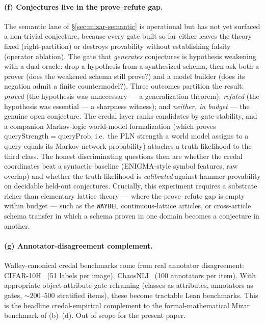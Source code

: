 \documentclass[]{article}
\newcommand{\lid}[1]{{\ttfamily\nolinkurl{#1}}}
\begin{document}
\paragraph{(f) Conjectures live in the prove--refute gap.} The semantic lane of
\S\ref{sec:mizar-semantic} is operational but has not yet surfaced a non-trivial
conjecture, because every gate built so far either leaves the theory fixed
(right-partition) or destroys provability without establishing falsity (operator
ablation). The gate that \emph{generates} conjectures is hypothesis weakening with a
dual oracle: drop a hypothesis from a synthesized schema, then ask both a prover
(does the weakened schema still prove?) and a model builder (does its negation admit
a finite countermodel?). Three outcomes partition the result: \emph{proved} (the
hypothesis was unnecessary --- a generalization theorem); \emph{refuted} (the
hypothesis was essential --- a sharpness witness); and \emph{neither, in budget} ---
the genuine open conjecture. The credal layer ranks candidates by gate-stability,
and a companion Markov-logic world-model formalization (which proves
$\mathrm{queryStrength} = \mathrm{queryProb}$, i.e.\ the PLN strength a world model
assigns to a query equals its Markov-network probability) attaches a
truth-likelihood to the third class. The honest discriminating questions then are
whether the credal coordinates beat a syntactic baseline (ENIGMA-style symbol
features, raw overlap) and whether the truth-likelihood is \emph{calibrated} against
hammer-provability on decidable held-out conjectures. Crucially, this experiment
requires a substrate richer than elementary lattice theory --- where the
prove--refute gap is empty within budget --- such as the \lid{WAYBEL}
continuous-lattice articles, or cross-article schema transfer in which a schema
proven in one domain becomes a conjecture in another.

\paragraph{(g) Annotator-disagreement complement.} Walley-canonical credal
benchmarks come from real annotator disagreement: CIFAR-10H~\cite{cifar10h} (51
labels per image), ChaosNLI~\cite{chaosnli} (100 annotators per item). With
appropriate object-attribute-gate reframing (classes as attributes, annotators as
gates, $\sim 200$--$500$ stratified items), these become tractable Lean
benchmarks. This is the headline credal-empirical complement to the
formal-mathematical Mizar benchmark of (b)--(d). Out of scope for the present paper.
\end{document}
